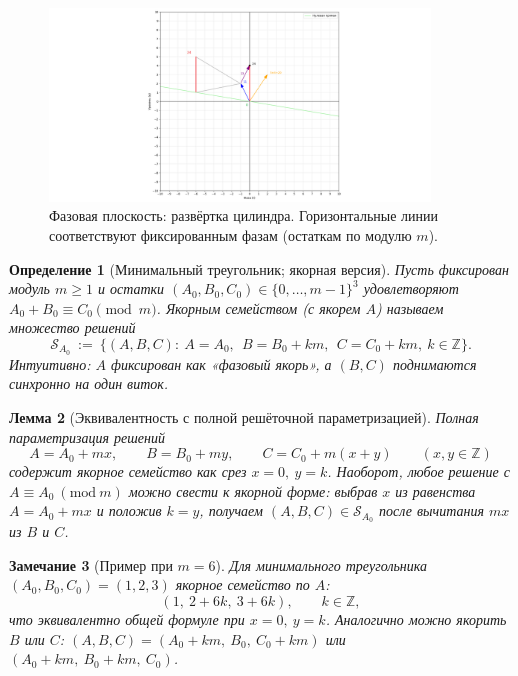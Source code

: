 \documentclass[11pt,a4paper]{article}
\newtheorem{definition}{Определение}[section]
\newtheorem{lemma}[definition]{Лемма}
\newtheorem{remark}[definition]{Замечание}
\begin{document}
\begin{figure}[H]
\centering
\includegraphics[width=0.9\textwidth]{phase_plane.png} %
\caption{Фазовая плоскость: развёртка цилиндра. Горизонтальные линии соответствуют фиксированным фазам (остаткам по модулю $m$).}
\label{fig:plane}
\end{figure}


\begin{definition}[Минимальный треугольник; якорная версия]
Пусть фиксирован модуль $m\ge1$ и остатки $(A_0,B_0,C_0)\in\{0,\dots,m-1\}^3$
удовлетворяют $A_0+B_0\equiv C_0\pmod m$. 
\emph{Якорным семейством} (с якорем $A$) называем множество решений
\[
\mathcal S_{A_0}\ :=\ \bigl\{(A,B,C):\ A=A_0,\ \ B=B_0+km,\ \ C=C_0+km,\ k\in\mathbb Z\bigr\}.
\]
Интуитивно: $A$ фиксирован как «фазовый якорь», а $(B,C)$ поднимаются синхронно на один виток.
\end{definition}

\begin{lemma}[Эквивалентность с полной решёточной параметризацией]
Полная параметризация решений
\[
A=A_0+mx,\qquad B=B_0+my,\qquad C=C_0+m(x+y)\qquad (x,y\in\mathbb Z)
\]
содержит якорное семейство как срез $x=0,\ y=k$. 
Наоборот, любое решение с $A\equiv A_0\ (\mathrm{mod}\ m)$ можно свести к якорной форме:
выбрав $x$ из равенства $A=A_0+mx$ и положив $k=y$, получаем $(A,B,C)\in\mathcal S_{A_0}$ после вычитания $mx$ из $B$ и $C$.
\end{lemma}

\begin{remark}[Пример при $m=6$]
Для минимального треугольника $(A_0,B_0,C_0)=(1,2,3)$ якорное семейство по $A$:
\[
(1,\ 2+6k,\ 3+6k),\qquad k\in\mathbb Z,
\]
что эквивалентно общей формуле при $x=0,\ y=k$. Аналогично можно якорить $B$ или $C$:
$(A,B,C)=(A_0+km,\ B_0,\ C_0+km)$ или $(A_0+km,\ B_0+km,\ C_0)$.
\end{remark}
\end{document}
